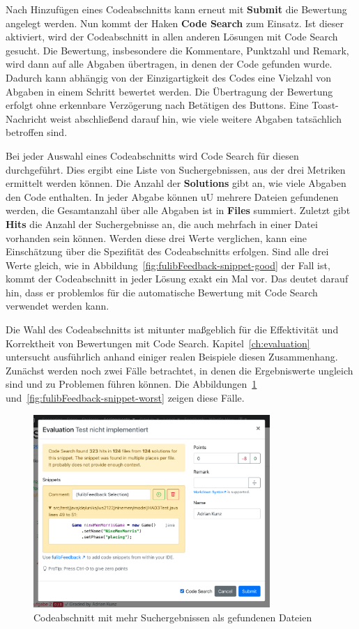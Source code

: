 Nach Hinzufügen eines Codeabschnitts kann erneut mit \textbf{Submit} die Bewertung angelegt werden.
Nun kommt der Haken \textbf{Code Search} zum Einsatz.
Ist dieser aktiviert, wird der Codeabschnitt in allen anderen Lösungen mit Code Search gesucht.
Die Bewertung, insbesondere die Kommentare, Punktzahl und Remark, wird dann auf alle Abgaben übertragen, in denen der Code gefunden wurde.
Dadurch kann abhängig von der Einzigartigkeit des Codes eine Vielzahl von Abgaben in einem Schritt bewertet werden.
Die Übertragung der Bewertung erfolgt ohne erkennbare Verzögerung nach Betätigen des Buttons.
Eine Toast-Nachricht weist abschließend darauf hin, wie viele weitere Abgaben tatsächlich betroffen sind.

Bei jeder Auswahl eines Codeabschnitts wird Code Search für diesen durchgeführt.
Dies ergibt eine Liste von Suchergebnissen, aus der drei Metriken ermittelt werden können.
Die Anzahl der \textbf{Solutions} gibt an, wie viele Abgaben den Code enthalten.
In jeder Abgabe können \ac{uU} mehrere Dateien gefundenen werden, die Gesamtanzahl über alle Abgaben ist in \textbf{Files} summiert.
Zuletzt gibt \textbf{Hits} die Anzahl der Suchergebnisse an, die auch mehrfach in einer Datei vorhanden sein können.
Werden diese drei Werte verglichen, kann eine Einschätzung über die Spezifität des Codeabschnitts erfolgen.
Sind alle drei Werte gleich, wie in Abbildung~\ref{fig:fulibFeedback-snippet-good} der Fall ist, kommt der Codeabschnitt in jeder Lösung exakt ein Mal vor.
Das deutet darauf hin, dass er problemlos für die automatische Bewertung mit Code Search verwendet werden kann.

Die Wahl des Codeabschnitts ist mitunter maßgeblich für die Effektivität und Korrektheit von Bewertungen mit Code Search.
Kapitel~\ref{ch:evaluation} untersucht ausführlich anhand einiger realen Beispiele diesen Zusammenhang.
Zunächst werden noch zwei Fälle betrachtet, in denen die Ergebniswerte ungleich sind und zu Problemen führen können.
Die Abbildungen~\ref{fig:fulibFeedback-snippet-bad} und~\ref{fig:fulibFeedback-snippet-worst} zeigen diese Fälle.

\begin{figure}
    \centering
    \includegraphics[width=0.8\textwidth]{images/fulibFeedback-snippet-bad}
    \caption{Codeabschnitt mit mehr Suchergebnissen als gefundenen Dateien}
    \label{fig:fulibFeedback-snippet-bad}
\end{figure}

